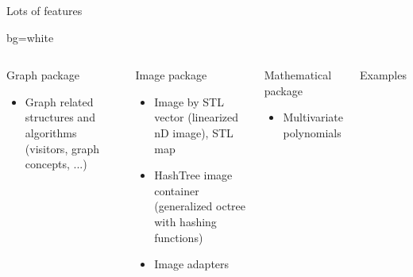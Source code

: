 \documentclass[noamsthm, pdftex, french]{beamer}
\begin{document}
\begin{frame}
\begin{columns}
\begin{alertblock}{\centering Lots of features}
\begin{beamercolorbox}{bg=white}
\begin{columns}[onlytextwidth]
        \begin{block}{Graph package}
          \begin{itemize}
            \item Graph related structures and algorithms
              (visitors, graph concepts, ...)
          \end{itemize}
          \end{block}
              
        
        
        \begin{block}{Image package}
          \begin{itemize}
            \item Image by STL vector (linearized nD image), STL map
            \item HashTree image container (generalized octree with
              hashing functions)
            \item Image adapters
          \end{itemize} 
          \end{block}
        
        \begin{block}{Mathematical package}
          \begin{itemize}
            \item Multivariate polynomials
          \end{itemize}  
        \end{block}

              \begin{exampleblock}{Examples}
                \centering
                

\end{exampleblock}
\end{columns}
\end{beamercolorbox}
\end{alertblock}
\end{columns}
\end{frame}
\end{document}

